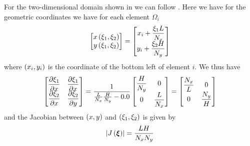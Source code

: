 For the two-dimensional domain shown in
 we can follow
. Here we have for the geometric
coordinates we have for each element $\Omega_{i}$
\begin{equation}
  \begin{bmatrix}
     x\left( \xi_{1},\xi_{2} \right)  \\
     y\left( \xi_{1},\xi_{2} \right) 
  \end{bmatrix}= \begin{bmatrix}
    x_{i}+\dfrac{\xi_{1}L}{N_{x}} \\
    y_{i}+\dfrac{\xi_{2}H}{N_{y}}  
  \end{bmatrix}
\end{equation}
where $\left( x_{i},y_{i} \right)$ is the coordinate of the bottom left of element $i$. We thus have 
\begin{equation}
  \begin{bmatrix}
     \dfrac{\partial \xi_{1}}{\partial x}  &  \dfrac{\partial \xi_{1}}{\partial x}  \\
     \dfrac{\partial \xi_{2}}{\partial x}  &  \dfrac{\partial \xi_{2}}{\partial y}          
  \end{bmatrix} = \dfrac{1}{\frac{L}{N_{x}}\frac{H}{N_{y}}-0.0} \begin{bmatrix}
    \dfrac{H}{N_{y}} & 0 \\
    0 & \dfrac{L}{N_{x}}
  \end{bmatrix} = \begin{bmatrix}
    \dfrac{N_{x}}{L} & 0 \\
    0 & \dfrac{N_{y}}{H}
  \end{bmatrix}
\end{equation}
and the Jacobian between $\left( x,y \right)$ and $\left( \xi_{1},\xi_{2} \right)$ is given by
\begin{equation}
  \left|  J\left(  \boldsymbol{\xi}  \right)  \right|=\dfrac{LH}{N_{x}N_{y}}
\end{equation}


